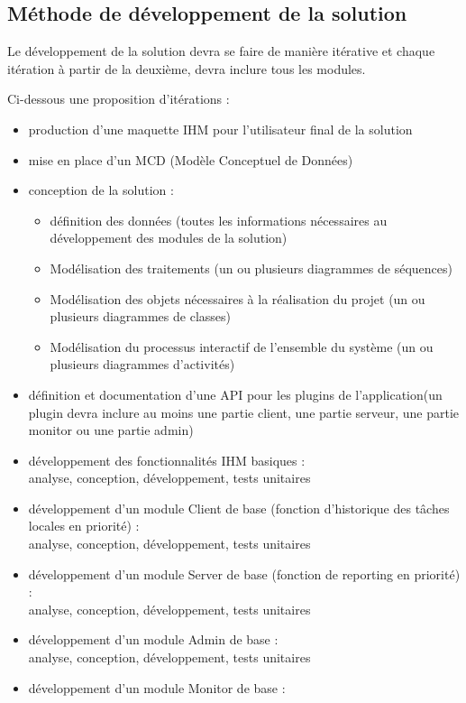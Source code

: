 \documentclass{bouygues-fr}
\begin{document}
\subsection{Méthode de développement de la solution}

Le développement de la solution devra se faire de manière itérative et chaque itération à partir  de  la   deuxième,  devra  inclure  tous  les  modules.

Ci-dessous  une  proposition d’itérations :
\begin{itemize}
\item production d’une maquette IHM pour l’utilisateur final de la solution
\item mise en place d’un MCD (Modèle Conceptuel de Données)
\item conception de la solution :
  \begin{itemize}
  \item définition des données (toutes les informations nécessaires au développement des modules de la solution)
  \item Modélisation des traitements (un ou plusieurs diagrammes de séquences)
  \item Modélisation des objets nécessaires à la réalisation du projet (un ou plusieurs diagrammes de classes)
  \item Modélisation du processus interactif de l'ensemble du système (un ou plusieurs diagrammes d'activités)
  \end{itemize}
\item définition et documentation d'une API pour les plugins de l'application(un plugin devra inclure au moins une partie client, une partie serveur, une partie monitor ou une partie admin)
\item développement  des fonctionnalités IHM basiques :\\
  analyse, conception, développement, tests unitaires
\item développement d'un module Client de base (fonction d'historique des tâches locales en priorité) :\\
  analyse, conception, développement, tests unitaires
\item développement d'un module  Server de base (fonction de reporting en priorité) :\\
  analyse, conception, développement, tests unitaires
\item développement d'un module Admin de base :\\
  analyse, conception, développement, tests unitaires
\item développement d'un module Monitor de base :\\

\end{itemize}
\end{document}
